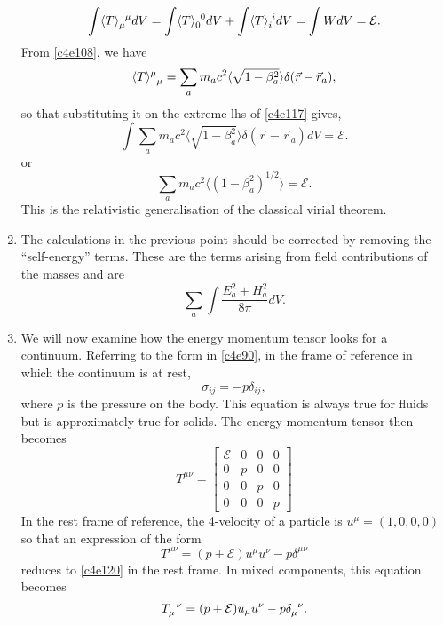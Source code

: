 \begin{enumerate}
\begin{equation}\label{c4e117}
\int \tensor{\langle T \rangle}{_\mu^\mu} dV = 
\int\tensor{\langle T \rangle}{_0^0} dV + 
\int\tensor{\langle T \rangle}{_i^i}dV = \int WdV = \mathcal{E}.
\end{equation}
From \eqref{c4e108}, we have
\[
\tensor{\langle T \rangle}{^{\mu}_\mu} = 
\sum_a m_ac^2\langle\sqrt{1 - \beta_a^2}\rangle\delta(\vec{r} - \vec{r}_a),
\]
so that substituting it on the extreme lhs of \eqref{c4e117} gives,
\[
\int \sum_a m_ac^2
\langle\sqrt{1 - \beta_a^2}\rangle\delta(\vec{r} - \vec{r}_a) dV = \mathcal{E}.
\]
or
\begin{equation}\label{c4e118}
\sum_a m_ac^2\langle(1 - \beta_a^2)^{1/2}\rangle = \mathcal{E}.
\end{equation}
This is the relativistic generalisation of the classical virial theorem.

\item The calculations in the previous point should be corrected by removing the
``self-energy'' terms. These are the terms arising from field contributions of 
the masses and are
\[
\sum_a \int\frac{E_a^2 + H_a^2}{8\pi}dV.
\]

\item We will now examine how the energy momentum tensor looks for a continuum.
Referring to the form in \eqref{c4e90}, in the frame of reference in which the
continuum is at rest,
\begin{equation}\label{c4e119}
\sigma_{ij} = -p\delta_{ij},
\end{equation}
where $p$ is the pressure on the body. This equation is always true for fluids
but is approximately true for solids. The energy momentum tensor then becomes
\begin{equation}\label{c4e120}
T^{\mu\nu} = \begin{bmatrix}\mathcal{E} & 0 & 0 & 0 \\
0 & p & 0 & 0 \\
0 & 0 & p & 0 \\
0 & 0 & 0 & p
\end{bmatrix}
\end{equation}
In the rest frame of reference, the 4-velocity of a particle is $u^\mu = 
(1, 0, 0, 0)$ so that an expression of the form
\begin{equation}\label{c4e121}
T^{\mu\nu} = (p + \mathcal{E})u^\mu u^\nu - p\delta^{\mu\nu}
\end{equation} 
reduces to \eqref{c4e120} in the rest frame. In mixed components, this equation
becomes
\begin{equation}\label{c4e122}
\tensor{T}{_\mu^\nu} = (p + \mathcal{E})u_\mu u^\nu - 
p\tensor{\delta}{_\mu^\nu}.
\end{equation} 


\end{enumerate}
